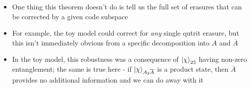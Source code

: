 \documentclass[12pt,a4paper]{article}
\numberwithin{equation}{section}
\newcommand{\Hcode}{\mathcal{H}_{\text{code}}}
\theoremstyle{definition}
\theoremstyle{theorem}
\theoremstyle{example}
\begin{document}
\begin{itemize}
\begin{proof}
				However, purifications are unitarily equivalent on the purifying system - $A$ in our case - so there exists unitary $U_{A}$ on $A$ taking $\ket{\phi}=U_{A}\ket{\phi'}$. Overall, we therefore have:
				\begin{equation}
					\begin{aligned}
						\frac{1}{\sqrt{|R|}}\sum_{i}\ket{i_{L}}_{R}\ket{i_{L}}_{A\overline{A}}&=U_{A}\left(\frac{1}{\sqrt{|R|}}\sum_{i}\ket{i_{L}}_{R}\ket{i}_{A_{1}}\otimes\ket{\chi}_{A_{2}\overline{A}}\right)\\
						\implies \ket{i_{L}}_{A\overline{A}}&=U_{A}\left(\ket{i}_{A_{1}}\otimes\ket{\chi}_{A_{2}\overline{A}}\right)
					\end{aligned}
				\end{equation}\\
				$(4)\implies(1)$: Just define $O_{A}\equiv U_{A}O_{A_{1}}U_{A}^{\dagger}$, where $O_{A_{1}}$ is an operator on $\mathcal{H}_{A_{1}}$ with the same matrix elements as $O_{L}$ does on $\Hcode$. $\blacksquare$
		\end{proof}
		\item One thing this theorem doesn't do is tell us the full set of erasures that can be corrected by a given code subspace
		\item For example, the toy model could correct for \textit{any} single qutrit erasure, but this isn't immediately obvious from a specific decomposition into $A$ and $\overline{A}$
		\item In the toy model, this robustness was a consequence of $\ket{\chi}_{23}$ having non-zero entanglement; the same is true here - if $\ket{\chi}_{A_{2}\overline{A}}$ is a product state, then $\overline{A}$ provides no additional information and we can do away with it
	\end{itemize}
\end{document}
